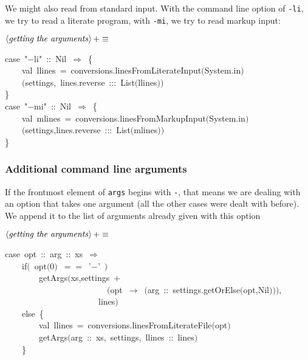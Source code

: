 \documentclass[a4paper,12pt]{article}
\begin{document}
We might also read from standard input. With the command line option
of \texttt{-li}, we try to read a literate program, with \texttt{-mi}, we try
to read markup input:

$\left<\mbox{\emph{getting the arguments}}\right>+\equiv$
\begin{program}{\vem case}~"$-$li"~{\rm :}{\rm :}~Nil~$\Rightarrow$~{\small\{}
\\~~~~{\vem val}~llines~=~conversions.linesFromLiterateInput$($System.in$)$
\\~~~~$($settings,~lines.reverse~{\rm :}{\rm :}{\rm :}~List$($llines$)$$)$
\\{\small\}}
\\{\vem case}~"$-$mi"~{\rm :}{\rm :}~Nil~$\Rightarrow$~{\small\{}
\\~~~~{\vem val}~mlines~=~conversions.linesFromMarkupInput$($System.in$)$
\\~~~~$($settings,lines.reverse~{\rm :}{\rm :}{\rm :}~List$($mlines$)$$)$
\\{\small\}}
\\[0.5em]\end{program}


\subsubsection{Additional command line arguments}
If the frontmost element of \texttt{args} begins with \texttt{-}, that means we
are dealing with an option that takes one argument (all the other cases
were dealt with before). We append it to the list of arguments already
given with this option

$\left<\mbox{\emph{getting the arguments}}\right>+\equiv$
\begin{program}{\vem case}~opt~{\rm :}{\rm :}~arg~{\rm :}{\rm :}~xs~$\Rightarrow$
\\~~~~{\vem if}$($~opt$($0$)$~$==$~'$-$'~$)$
\\~~~~~~~~getArgs$($xs,settings~$+$
\\~~~~~~~~~~~~~~~~~~~~~~~~$($opt~$\rightarrow$~$($arg~{\rm :}{\rm :}~settings.getOrElse$($opt,Nil$)$$)$$)$,
\\~~~~~~~~~~~~~~~~~~~~~~lines$)$
\\~~~~{\vem else}~{\small\{}
\\~~~~~~~~{\vem val}~llines~=~conversions.linesFromLiterateFile$($opt$)$
\\~~~~~~~~getArgs$($arg~{\rm :}{\rm :}~xs,~settings,~llines~{\rm :}{\rm :}~lines$)$
\\~~~~{\small\}}
\\[0.5em]\end{program}
\end{document}
